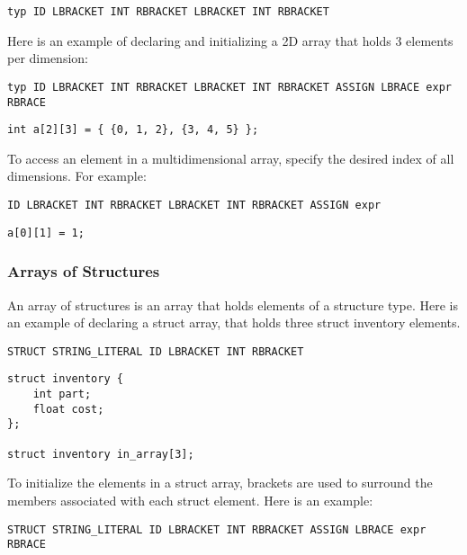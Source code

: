 \documentclass{article}
\begin{document}
\begin{Verbatim}[frame=single]
typ ID LBRACKET INT RBRACKET LBRACKET INT RBRACKET
\end{Verbatim}


Here is an example of declaring and initializing a 2D array that holds 3 elements per dimension:

\begin{Verbatim}[frame=single]
typ ID LBRACKET INT RBRACKET LBRACKET INT RBRACKET ASSIGN LBRACE expr RBRACE
\end{Verbatim}

 \begin{lstlisting}
int a[2][3] = { {0, 1, 2}, {3, 4, 5} };
\end{lstlisting}

To access an element in a multidimensional array, specify the desired index of all dimensions. For example:

\begin{Verbatim}[frame=single]
ID LBRACKET INT RBRACKET LBRACKET INT RBRACKET ASSIGN expr
\end{Verbatim}

 \begin{lstlisting}
a[0][1] = 1;
\end{lstlisting}

\subsubsection{Arrays of Structures}
An array of structures is an array that holds elements of a structure type. Here is an example of declaring a struct array, that holds three struct inventory elements. 

\begin{Verbatim}[frame=single]
STRUCT STRING_LITERAL ID LBRACKET INT RBRACKET
\end{Verbatim}

 \begin{lstlisting}
struct inventory {
	int part;
	float cost;
};

struct inventory in_array[3];

\end{lstlisting}

To initialize the elements in a struct array, brackets are used to surround the members associated with each struct element. Here is an example:

\begin{Verbatim}[frame=single]
STRUCT STRING_LITERAL ID LBRACKET INT RBRACKET ASSIGN LBRACE expr RBRACE
\end{Verbatim}
\end{document}
